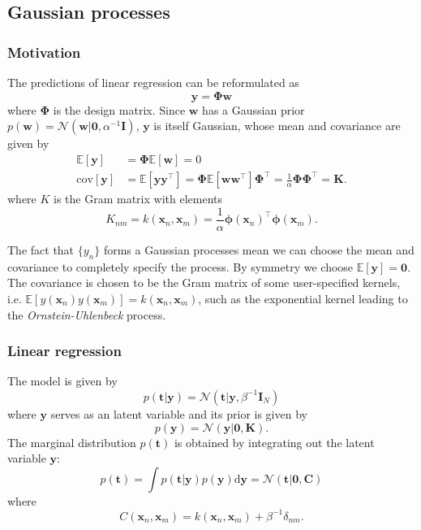 \documentclass[a4paper]{report}
\newcommand{\ud}{\mathrm{d}}
\newcommand{\up}{\mathrm}
\renewcommand{\bf}{\mathbf}
\renewcommand{\cal}{\mathcal}
\newcommand{\bb}{\mathbb}
\newcommand{\imp}[1]{{\color{blue}\textit{#1}}}
\newcommand{\bs}{\boldsymbol}
\begin{document}
\subsection{Gaussian processes}
\subsubsection{Motivation}
The predictions of linear regression can be reformulated as
\begin{equation}
	\bf{y } = \bs{\Phi} \bf{w}
\end{equation}
where $\bs{\Phi}$ is the design matrix. Since $\bf{w}$ has a Gaussian prior $p(\bf{w}) = \cal{N}(\bf{w}|\bf{0},\alpha^{-1}\bf{I})$, $\bf{y}$ is itself Gaussian, whose mean and covariance are given by
\begin{align}
	\bb{E}[\bf{y}] &= \bs{\Phi} \bb{E}[\bf{w}] = 0\\
	\up{cov}[\bf{y}] &= \bb{E}[\bf{y}\bf{y}^{\intercal}] = \bs{\Phi}\bb{E}[\bf{w}\bf{w}^{\intercal}]\bs{\Phi}^{\intercal} = \frac{1}{\alpha}\bs{\Phi}\bs{\Phi}^{\intercal} = \bf{K}.
\end{align}
where $K$ is the Gram matrix with elements
\begin{equation}
	K_{nm} = k(\bf{x}_n,\bf{x}_m) = \frac{1}{\alpha} \bs{\phi}(\bf{x}_n)^{\intercal} \bs{\phi}(\bf{x}_m).
\end{equation}

The fact that $\{ y_n \}$ forms a Gaussian processes mean we can choose the mean and covariance to completely specify the process. By symmetry we choose $\bb{E}[\bf{y}] = \bf{0}$. The covariance is chosen to be the Gram matrix of some user-specified kernels, i.e. $\bb{E}[y(\bf{x}_n) y(\bf{x}_m)]=k(\bf{x}_n,\bf{x}_m)$, such as the exponential kernel leading to the \imp{Ornstein-Uhlenbeck} process.
\subsubsection{Linear regression}
The model is given by
\begin{equation}
	p(\bf{t|y}) = \cal{N}(\bf{t|y},\beta^{-1} \bf{I}_N)
\end{equation}
where $\bf{y}$ serves as an latent variable and its prior is given by
\begin{equation}
	p(\bf{y}) = \cal{N}(\bf{y|0,K}).
\end{equation}
The marginal distribution $p(\bf{t})$ is obtained by integrating out the latent variable $\bf{y}$:
\begin{equation}
	p(\bf{t}) = \int p(\bf{t|y})p(\bf{y}) \ud \bf{y} = \cal{N}(\bf{t}|\bf{0,C})
\end{equation}
where
\begin{equation}
	C(\bf{x}_n,\bf{x}_m) = k(\bf{x}_n,\bf{x}_m) + \beta^{-1} \delta_{nm}. \label{GauPro1}
\end{equation}
\end{document}
